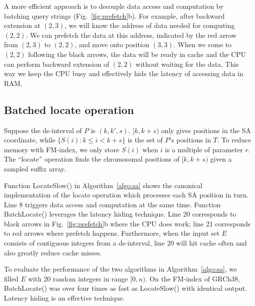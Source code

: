 \documentclass[webpdf,contemporary,large,namedate]{oup-authoring-template}%
\begin{document}
A more efficient approach is to decouple data access and computation by batching query strings (Fig.~\ref{fig:prefetch}b).
For example, after backward extension at $(2,3)$, we will know the address of data needed for computing $(2,2)$.
We can prefetch the data at this address, indicated by the red arrow from $(2,3)$ to $(2,2)$, and move onto position $(3,3)$.
When we come to $(2,2)$ following the black arrows, the data will be ready in cache and the CPU can perform backward extension of $(2,2)$ without waiting for the data.
This way we keep the CPU busy and effectively hide the latency of accessing data in RAM.

\subsection{Batched locate operation}

Suppose the ds-interval of $P$ is $(k,k',s)$.
$[k,k+s)$ only gives positions in the SA coordinate, while
$\{S(i):k\le i<k+s\}$ is the set of $P$'s positions in $T$.
To reduce memory with FM-index, we only store $S(i)$ when $i$ is a multiple of parameter $r$.
The ``locate'' operation finds the chromosomal positions of $[k,k+s)$ given a sampled suffix array.

Function {\sc LocateSlow()} in Algorithm~\ref{algo:sa} shows the canonical implementation of the locate operation which processes each SA position in turn.
Line 8 triggers data access and computation at the same time.
Function {\sc BatchLocate()} leverages the latency hiding technique.
Line 20 corresponds to black arrows in Fig.~\ref{fig:prefetch}b where the CPU does work;
line 21 corresponds to red arrows where prefetch happens.
Furthermore, when the input set $E$ consists of contiguous integers from a ds-interval,
line 20 will hit cache often and also greatly reduce cache misses.

To evaluate the performance of the two algorithms in Algorithm~\ref{algo:sa},
we filled $E$ with 20 random integers in range $[0,n)$.
On the FM-index of GRCh38, {\sc BatchLocate()} was over four times as fast as {\sc LocateSlow()} with identical output.
Latency hiding is an effective technique.
\end{document}
